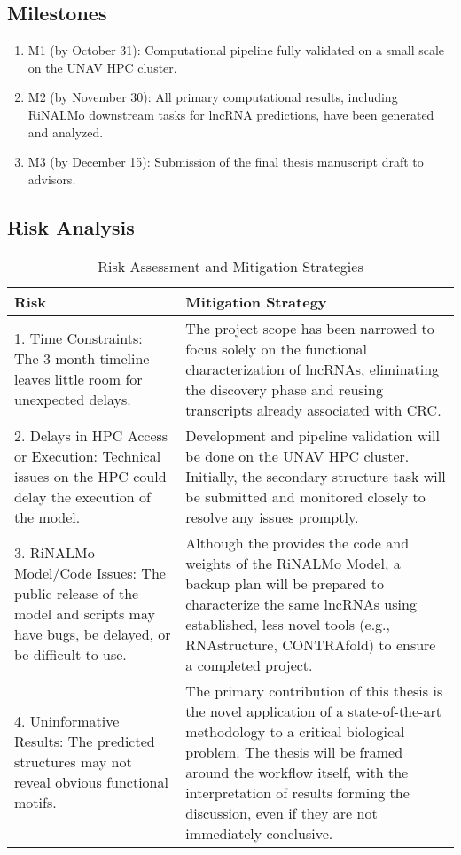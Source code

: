 \documentclass[ENG]{TFUOC}%
\begin{document}
\subsection{Milestones}
\begin{enumerate}
    \item M1 (by October 31): Computational pipeline fully validated on a small scale on the UNAV HPC cluster.
    \item M2 (by November 30): All primary computational results, including RiNALMo downstream tasks for lncRNA predictions, have been generated and analyzed.
    \item M3 (by December 15): Submission of the final thesis manuscript draft to advisors.
    
\end{enumerate}
\subsection{Risk Analysis}

\begin{table}[htbp]
    \centering
    \caption{Risk Assessment and Mitigation Strategies}
    \label{tab:risk-mitigation}
    \begin{tabular}{p{7cm} p{7cm}}
        \hline
        \textbf{Risk} & \textbf{Mitigation Strategy} \\
        \hline
        1. Time Constraints: The 3-month timeline leaves little room for unexpected delays. &
        The project scope has been narrowed to focus solely on the functional characterization of lncRNAs, eliminating the discovery phase and reusing transcripts already associated with CRC. \\

        2. Delays in HPC Access or Execution: Technical issues on the HPC could delay the execution of the model. &
        Development and pipeline validation will be done on the UNAV HPC cluster. Initially, the secondary structure task will be submitted and monitored closely to resolve any issues promptly. \\

        3. RiNALMo Model/Code Issues: The public release of the model and scripts may have bugs, be delayed, or be difficult to use. &
        Although the \cite{penicRiNALMoGeneralpurposeRNA2025} provides the code and weights of the RiNALMo Model, a backup plan will be prepared to characterize the same lncRNAs using established, less novel tools (e.g., RNAstructure, CONTRAfold) to ensure a completed project. \\

        4. Uninformative Results: The predicted structures may not reveal obvious functional motifs. &
        The primary contribution of this thesis is the novel application of a state-of-the-art methodology to a critical biological problem. The thesis will be framed around the workflow itself, with the interpretation of results forming the discussion, even if they are not immediately conclusive. \\
        \hline
    \end{tabular}
\end{table}
\end{document}
